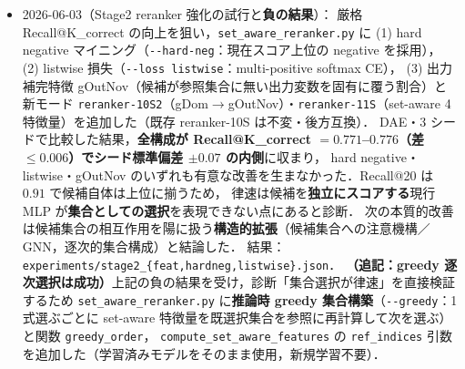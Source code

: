 \documentclass[11pt,a4paper]{jsarticle}
\begin{document}
\begin{itemize}[nosep]
    補完性の依存ケースは sep がむしろ低い（標準化平均差 $-0.31$）．
    代わりに頑健に現れたのは\textbf{系の大きさ}で，依存ケースは正解式数・入力変数数・出力変数数・出典数が
    いずれも大きい（一貫性の正解式数で標準化平均差 $+0.49$）．
    分野一致度の集約 PFI が $\approx 0$ なのは寄与が無いためではなく\textbf{相殺}による：
    全ケース母集団で分離時（sep $>0$）の平均低下 $+0.012$ に対し逆分離時（sep $<0$）は $-0.034$ と符号が反転する
    （Mann--Whitney $p=1.3\times10^{-8}$）．すなわち置換は分離時には性能を下げ，逆分離時には上げる．
    なお解析途上で\textbf{疑似反復}（同一ケースが複数シードのテストに出現し，2,067 記録が実は 727 ケース，平均 2.84 回）を
    独立観測として検定していた誤りを発見し，ケース単位に集約してから検定するよう修正した．
    修正前は補完性が $p=0.009$ と有意に見えていたが，修正後は $p=0.78$ で有意性は消えた．
    また依存群と頑健群に同一ケースが重複していた（補完性で 62.5\,\%）問題も同時に解消した．
    結果：\texttt{experiments/pfi\_per\_case.json}，\texttt{experiments/pfi\_profile\_stats.json}，
    \texttt{docs/figures/fig\_pfi\_dependence\_profile.png}．
  \item 2026-06-03（Stage2 reranker 強化の試行と\textbf{負の結果}）：
    厳格 Recall@K\_correct の向上を狙い，\texttt{set\_aware\_reranker.py} に
    (1) hard negative マイニング（\texttt{-{}-hard-neg}：現在スコア上位の negative を採用），
    (2) listwise 損失（\texttt{-{}-loss listwise}：multi-positive softmax CE），
    (3) 出力補完特徴 gOutNov（候補が参照集合に無い出力変数を固有に覆う割合）と
    新モード \texttt{reranker-10S2}（gDom$\to$gOutNov）・\texttt{reranker-11S}（set-aware 4 特徴量）を追加した（既存 reranker-10S は不変・後方互換）．
    DAE・3 シードで比較した結果，\textbf{全構成が Recall@K\_correct $=0.771$--$0.776$（差 $\le 0.006$）でシード標準偏差 $\pm 0.07$ の内側}に収まり，
    hard negative・listwise・gOutNov のいずれも有意な改善を生まなかった．Recall@20 は $0.91$ で候補自体は上位に揃うため，
    律速は候補を\textbf{独立にスコアする}現行 MLP が\textbf{集合としての選択}を表現できない点にあると診断．
    次の本質的改善は候補集合の相互作用を陽に扱う\textbf{構造的拡張}（候補集合への注意機構／GNN，逐次的集合構成）と結論した．
    結果：\texttt{experiments/stage2\_\{feat,hardneg,listwise\}.json}．
    \textbf{（追記：greedy 逐次選択は成功）}上記の負の結果を受け，診断「集合選択が律速」を直接検証するため
    \texttt{set\_aware\_reranker.py} に\textbf{推論時 greedy 集合構築}（\texttt{-{}-greedy}：1 式選ぶごとに
    set-aware 特徴量を既選択集合を参照に再計算して次を選ぶ）と関数 \texttt{greedy\_order}，
    \texttt{compute\_set\_aware\_features} の \texttt{ref\_indices} 引数を追加した（学習済みモデルをそのまま使用，新規学習不要）．

\end{itemize}
\end{document}
